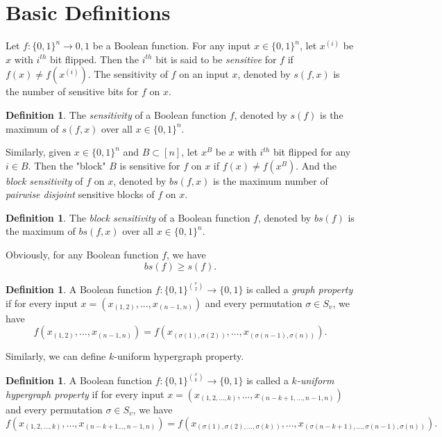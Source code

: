 \documentclass[psamsfonts]{amsart}
\theoremstyle{definition}
\newtheorem{defn}[theorem]{Definition}
\theoremstyle{remark}
\numberwithin{equation}{section}
\begin{document}
	\section{Basic Definitions}
		Let $f: \{0,1\}^n \to {0,1}$ be a Boolean function. For any input $x \in \{0,1 \}^n$, let $x^{(i)}$ be $x$ with $i^{th}$ bit flipped. Then the $i ^ {th}$ bit is said to be \textit{sensitive} for $f$ if $f(x) \neq f(x^{(i)})$. The sensitivity of $f$ on an input $x$, denoted by $s(f,x)$ is the number of sensitive bits for $f$ on $x$.
		\begin{defn}
			The \textit{sensitivity} of a Boolean function $f$, denoted by $s(f)$ is the maximum of $s(f,x)$ over all $x \in \{0,1\}^n$.
		\end{defn}
		Similarly, given $x \in \{0,1\}^n$ and $B \subset [n]$, let $x^{B}$ be $x$ with $i^{th}$ bit flipped for any $i \in B$. Then the "block" $B$ is sensitive for $f$ on $x$ if $f(x) \neq f(x^B)$. And the \textit{block sensitivity} of $f$ on $x$, denoted by $bs(f,x)$ is the maximum number of \textit{pairwise disjoint} sensitive blocks of $f$ on $x$.
		\begin{defn}
			The \textit{block sensitivity} of a Boolean function $f$, denoted by $bs(f)$ is the maximum of $bs(f,x)$ over all $x \in \{0,1\}^n$.
		\end{defn}
		Obviously, for any Boolean function $f$, we have 
		\begin{equation}
			bs(f) \geq s(f). \nonumber
		\end{equation}
		
		\begin{defn}
			A Boolean function $f: \{0,1\}^{v \choose{2}} \to \{0,1\}$ is called a \textit{graph property} if for every input $x = (x_{(1,2)},...,x_{(n-1,n)})$ and every permutation $\sigma \in S_v$, we have
			\begin{equation}
				f(x_{(1,2)},...,x_{(n-1,n)}) = f(x_{(\sigma (1), \sigma (2))},...,x_{(\sigma (n-1), \sigma (n))}). \nonumber
			\end{equation}
		\end{defn}
		Similarly, we can define $k$-uniform hypergraph property.
			\begin{defn}
				A Boolean function $f: \{0,1\}^{v \choose{k}} \to \{0,1\}$ is called a \textit{$k$-uniform hypergraph property} if for every input $x = (x_{(1,2,...,k)},...,x_{(n-k+1,...,n-1,n)})$ and every permutation $\sigma \in S_v$, we have
			\begin{equation}
				f(x_{(1,2,...,k)},...,x_{(n-k+1...,n-1,n)}) = f(x_{(\sigma (1), \sigma (2),..., \sigma(k))},...,x_{(\sigma (n-k+1),...,\sigma (n-1), \sigma (n))}). \nonumber
			\end{equation}
			\end{defn}
\end{document}
